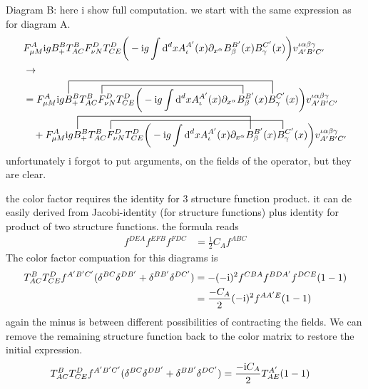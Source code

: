 Diagram B:
here i show full computation.
we start with the same expression as for diagram A. 
\begin{align}
	&\ft_{\mu M}^{A} \imag g B_+^B  T^B_{AC} \ft _{\nu N}^D T^D_{CE}\bigg(-\imag g \int \ddx xA_\iota^{A'}(x) \partial_{x^\alpha} B_\beta^{B'} (x) B_\gamma^{C'}(x) \bigg) v^{\iota \alpha\beta\gamma}_{A'B'C'}
	\\
	&\rightarrow
	\\
	&=
	\contraction[2ex]{\ft_{\mu M}^{A} \imag g B_+^B  T^B_{AC} }{\ft}{_{\nu N}^D T^D_{CE}\bigg(-\imag g \int \ddx xA_\iota^{A'}(x) \partial_{x^\alpha}}{B}
	\contraction[3ex]{\ft_{\mu M}^{A} \imag g}{B}{_+^B  T^B_{AC} \ft _{\nu N}^D T^D_{CE}\bigg(-\imag g \int \ddx xA_\iota^{A'}(x) \partial_{x^\alpha} B_\beta^{B'} (x)}{B}
	\ft_{\mu M}^{A} \imag g B_+^B  T^B_{AC} \ft _{\nu N}^D T^D_{CE}\bigg(-\imag g \int \ddx xA_\iota^{A'}(x) \partial_{x^\alpha} B_\beta^{B'} (x) B_\gamma^{C'}(x) \bigg) v^{\iota \alpha\beta\gamma}_{A'B'C'}
	\nl
	\contraction[3ex]{+\ft_{\mu M}^{A} \imag g }{B}{_+^B  T^B_{AC} \ft _{\nu N}^D T^D_{CE}\bigg(-\imag g \int \ddx xA_\iota^{A'}(x) \partial_{x^\alpha}}{B}
	\contraction[2ex]{+\ft_{\mu M}^{A} \imag g B_+^B  T^B_{AC}}{\ft}{_{\nu N}^D T^D_{CE}\bigg(-\imag g \int \ddx xA_\iota^{A'}(x) \partial_{x^\alpha} B_\beta^{B'} (x)}{B}
	+\ft_{\mu M}^{A} \imag g B_+^B  T^B_{AC} \ft _{\nu N}^D T^D_{CE}\bigg(-\imag g \int \ddx xA_\iota^{A'}(x) \partial_{x^\alpha} B_\beta^{B'} (x) B_\gamma^{C'}(x) \bigg) v^{\iota \alpha\beta\gamma}_{A'B'C'}
\end{align}
unfortunately i forgot to put arguments, on the fields of the operator, but they are clear.

the color factor requires the identity for 3 structure function product. 
it can de easily derived from Jacobi-identity (for structure functions) plus identity for product of two structure functions.
the formula reads
\begin{align}
	f^{DEA}f^{EFB}f^{FDC} &= \frac{1}{2}C_A f^{ABC}
\end{align}
The color factor compuation for this diagrams is
\begin{align}
	 T^{B}_{AC} T^{D}_{CE} f^{A'B'C'}( \delta^{BC}\delta^{DB'} + \delta^{BB'}\delta^{DC'})
	&=
	-(-\text{i})^2f^{CBA}f^{BDA'}f^{DCE} (1-1)
	\\
	&=
	\frac{- C_A}{2}(-\text{i})^2f^{AA'E} (1-1)
\end{align}
again the minus is between different possibilities of contracting the fields. 
We can remove the remaining structure function back to the color matrix to restore the initial expression.
\begin{align}
 T^{B}_{AC} T^{D}_{CE} f^{A'B'C'}( \delta^{BC}\delta^{DB'} + \delta^{BB'}\delta^{DC'})
	&=
	\frac{-\text{i} C_A}{2} T^{A'}_{AE} (1-1)
\end{align}


